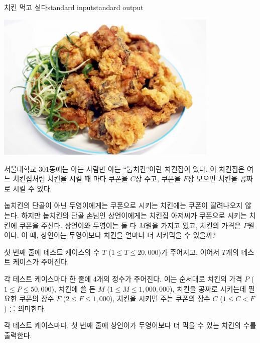 \begin{problem}{치킨 먹고 싶다}{standard input}{standard output}

\begin{center}
  \includegraphics[width=0.8\textwidth]{chicken.jpg}
\end{center}

서울대학교 301동에는 아는 사람만 아는 ``눕치킨''이란 치킨집이 있다. 이 치킨집은 여느 치킨집처럼 치킨을 시킬 때 마다 쿠폰을 $C$장 주고, 쿠폰을 $F$장 모으면 치킨을 공짜로 시킬 수 있다.

눕치킨의 단골이 아닌 두영이에게는 쿠폰으로 시키는 치킨에는 쿠폰이 딸려나오지 않는다. 하지만 눕치킨의 단골 손님인 상언이에게는 치킨집 아저씨가 쿠폰으로 시키는 치킨에 쿠폰을 주신다. 상언이와 두영이는 둘 다 $M$원을 가지고 있고, 치킨의 가격은 $P$원이다. 이 때, 상언이는 두영이보다 치킨을 얼마나 더 시켜먹을 수 있을까?

\InputFile
첫 번째 줄에 테스트 케이스의 수 $T$ ($1 \le T \le 20,000$)가 주어지고, 이어서 $T$개의 테스트 케이스가 주어진다.

각 테스트 케이스마다 한 줄에 4개의 정수가 주어진다. 이는 순서대로
치킨의 가격 $P$ ($1 \le P \le 50,000$), 치킨에 쓸 돈 $M$ ($1 \le M \le 1,000,000$), 치킨을 공짜로 시키는데 필요한 쿠폰의 장수 $F$ ($2 \le F \le 1,000$), 치킨을 시키면 주는 쿠폰의 장수 $C$ ($1 \le C < F$) 를 의미한다.

\OutputFile
각 테스트 케이스마다, 첫 번째 줄에 상언이가 두영이보다 더 먹을 수 있는 치킨의 수를 출력한다.

\Example

\begin{example}
%
\end{example}

\end{problem}
